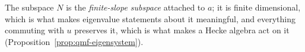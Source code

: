 The subspace $N$ is the \emph{finite-slope subspace} attached to $a$; it is finite dimensional,
which is what makes eigenvalue statements about it meaningful, and everything commuting with $u$
preserves it, which is what makes a Hecke algebra act on it (Proposition~\ref{prop:qmf-eigensystem}).

